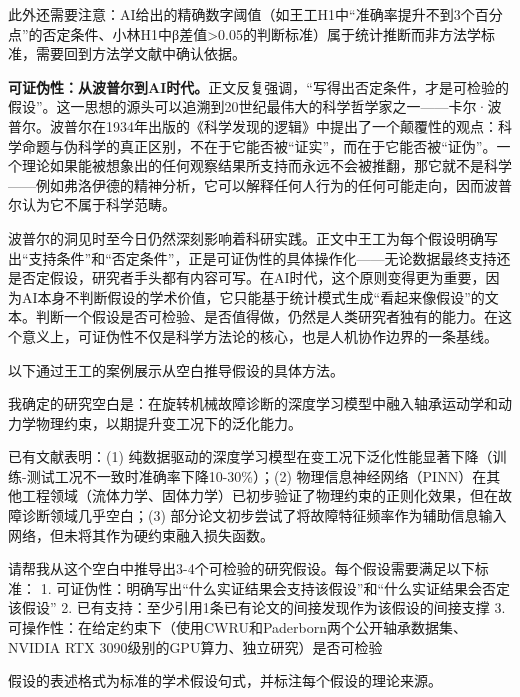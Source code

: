 此外还需要注意：AI给出的精确数字阈值（如王工H1中``准确率提升不到3个百分点''的否定条件、小林H1中β差值>0.05的判断标准）属于统计推断而非方法学标准，需要回到方法学文献中确认依据。

\begin{funbox}
\textbf{可证伪性：从波普尔到AI时代。}正文反复强调，``写得出否定条件，才是可检验的假设''。这一思想的源头可以追溯到20世纪最伟大的科学哲学家之一——卡尔·波普尔。波普尔在1934年出版的《科学发现的逻辑》中提出了一个颠覆性的观点：科学命题与伪科学的真正区别，不在于它能否被``证实''，而在于它能否被``证伪''。一个理论如果能被想象出的任何观察结果所支持而永远不会被推翻，那它就不是科学——例如弗洛伊德的精神分析，它可以解释任何人行为的任何可能走向，因而波普尔认为它不属于科学范畴。

波普尔的洞见时至今日仍然深刻影响着科研实践。正文中王工为每个假设明确写出``支持条件''和``否定条件''，正是可证伪性的具体操作化——无论数据最终支持还是否定假设，研究者手头都有内容可写。在AI时代，这个原则变得更为重要，因为AI本身不判断假设的学术价值，它只能基于统计模式生成``看起来像假设''的文本。判断一个假设是否可检验、是否值得做，仍然是人类研究者独有的能力。在这个意义上，可证伪性不仅是科学方法论的核心，也是人机协作边界的一条基线。
\end{funbox}

以下通过王工的案例展示从空白推导假设的具体方法。

\begin{userbox}
我确定的研究空白是：在旋转机械故障诊断的深度学习模型中融入轴承运动学和动力学物理约束，以期提升变工况下的泛化能力。

已有文献表明：(1) 纯数据驱动的深度学习模型在变工况下泛化性能显著下降（训练-测试工况不一致时准确率下降10-30\%）；(2) 物理信息神经网络（PINN）在其他工程领域（流体力学、固体力学）已初步验证了物理约束的正则化效果，但在故障诊断领域几乎空白；(3) 部分论文初步尝试了将故障特征频率作为辅助信息输入网络，但未将其作为硬约束融入损失函数。

请帮我从这个空白中推导出3-4个可检验的研究假设。每个假设需要满足以下标准：
1. 可证伪性：明确写出``什么实证结果会支持该假设''和``什么实证结果会否定该假设''
2. 已有支持：至少引用1条已有论文的间接发现作为该假设的间接支撑
3. 可操作性：在给定约束下（使用CWRU和Paderborn两个公开轴承数据集、NVIDIA RTX 3090级别的GPU算力、独立研究）是否可检验

假设的表述格式为标准的学术假设句式，并标注每个假设的理论来源。
\end{userbox}

